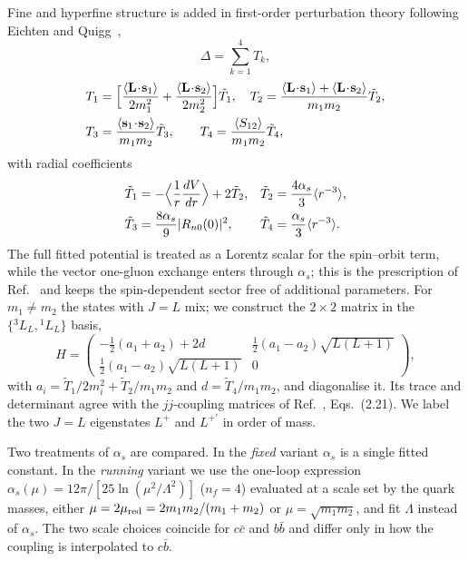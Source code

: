 \documentclass[10pt,twocolumn]{article}
\newcommand{\cc}{c\bar c}
\newcommand{\bb}{b\bar b}
\newcommand{\cb}{c\bar b}
\begin{document}
Fine and hyperfine structure is added in first-order perturbation theory following Eichten and Quigg~\cite{Eichten1994},
\begin{equation}
  \Delta = \sum_{k=1}^4 T_k,
\end{equation}
\begin{align}
  T_1 &= \Big[\frac{\langle\mathbf L\!\cdot\!\mathbf s_1\rangle}{2m_1^2}+\frac{\langle\mathbf L\!\cdot\!\mathbf s_2\rangle}{2m_2^2}\Big]\tilde T_1,\quad
  T_2 = \frac{\langle\mathbf L\!\cdot\!\mathbf s_1\rangle+\langle\mathbf L\!\cdot\!\mathbf s_2\rangle}{m_1m_2}\tilde T_2,\notag\\
  T_3 &= \frac{\langle\mathbf s_1\!\cdot\!\mathbf s_2\rangle}{m_1m_2}\tilde T_3,\qquad
  T_4 = \frac{\langle S_{12}\rangle}{m_1m_2}\tilde T_4,
\end{align}
with radial coefficients
\begin{align}
  \tilde T_1 &= -\Big\langle\frac1r\frac{dV}{dr}\Big\rangle+2\tilde T_2, &
  \tilde T_2 &= \frac{4\alpha_s}{3}\langle r^{-3}\rangle,\notag\\
  \tilde T_3 &= \frac{8\alpha_s}{9}|R_{n0}(0)|^2, &
  \tilde T_4 &= \frac{\alpha_s}{3}\langle r^{-3}\rangle .
  \label{eq:Ttilde}
\end{align}
The full fitted potential is treated as a Lorentz scalar for the spin--orbit term, while the vector one-gluon exchange enters through $\alpha_s$; this is the prescription of Ref.~\cite{Eichten1994} and keeps the spin-dependent sector free of additional parameters.
For $m_1\neq m_2$ the states with $J=L$ mix; we construct the $2\times2$ matrix in the $\{{}^3L_L,{}^1L_L\}$ basis,
\begin{equation}
  H=\begin{pmatrix} -\tfrac12(a_1+a_2)+2d & \tfrac12(a_1-a_2)\sqrt{L(L+1)}\\ \tfrac12(a_1-a_2)\sqrt{L(L+1)} & 0\end{pmatrix},
\end{equation}
with $a_i=\tilde T_1/2m_i^2+\tilde T_2/m_1m_2$ and $d=\tilde T_4/m_1m_2$, and diagonalise it.
Its trace and determinant agree with the $jj$-coupling matrices of Ref.~\cite{Eichten1994}, Eqs.~(2.21).
We label the two $J=L$ eigenstates $L^{+}$ and $L^{+\prime}$ in order of mass.

Two treatments of $\alpha_s$ are compared.
In the \emph{fixed} variant $\alpha_s$ is a single fitted constant.
In the \emph{running} variant we use the one-loop expression $\alpha_s(\mu)=12\pi/[25\ln(\mu^2/\Lambda^2)]$ ($n_f=4$) evaluated at a scale set by the quark masses, either $\mu=2\mu_{\rm red}=2m_1m_2/(m_1+m_2)$ or $\mu=\sqrt{m_1m_2}$, and fit $\Lambda$ instead of $\alpha_s$.
The two scale choices coincide for $\cc$ and $\bb$ and differ only in how the coupling is interpolated to $\cb$.
\end{document}
